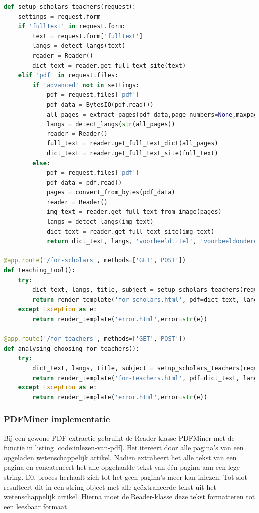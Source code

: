 \begin{lstlisting}[language=Python, caption={Koppeling tussen frontend en backend voor het inlezen van een wetenschappelijk artikel}, label={code:inlezen-wetenschappelijk-artikel-front-end-back-end}]
def setup_scholars_teachers(request):
	settings = request.form
	if 'fullText' in request.form:
		text = request.form['fullText']
		langs = detect_langs(text)
		reader = Reader()
		dict_text = reader.get_full_text_site(text)                
	elif 'pdf' in request.files:
		if 'advanced' not in settings:
			pdf = request.files['pdf']
			pdf_data = BytesIO(pdf.read())
			all_pages = extract_pages(pdf_data,page_numbers=None,maxpages=999)
			langs = detect_langs(str(all_pages))
			reader = Reader()
			full_text = reader.get_full_text_dict(all_pages)
			dict_text = reader.get_full_text_site(full_text)
		else:
			pdf = request.files['pdf']
			pdf_data = pdf.read()
			pages = convert_from_bytes(pdf_data)
			reader = Reader()
			img_text = reader.get_full_text_from_image(pages)
			langs = detect_langs(img_text)
			dict_text = reader.get_full_text_site(img_text)                            
			return dict_text, langs, 'voorbeeldtitel', 'voorbeeldonderwerp'
			
@app.route('/for-scholars', methods=['GET','POST'])
def teaching_tool():
	try:
		dict_text, langs, title, subject = setup_scholars_teachers(request)
		return render_template('for-scholars.html', pdf=dict_text, lang=langs, title=title, subject=subject)
	except Exception as e:
		return render_template('error.html',error=str(e))
	
@app.route('/for-teachers', methods=['GET','POST'])
def analysing_choosing_for_teachers():
	try:
		dict_text, langs, title, subject = setup_scholars_teachers(request)
		return render_template('for-teachers.html', pdf=dict_text, lang=langs, title=title, subject=subject)
	except Exception as e:
		return render_template('error.html',error=str(e))
\end{lstlisting}

\subsubsection{PDFMiner implementatie}

Bij een gewone PDF-extractie gebruikt de Reader-klasse PDFMiner met de functie in listing \ref{code:inlezen-van-pdf}. Het itereert door alle pagina's van een opgeladen wetenschappelijk artikel. Nadien extraheert het alle tekst van een pagina en concateneert het alle opgehaalde tekst van één pagina aan een lege string. Dit proces herhaalt zich tot het geen pagina's meer kan inlezen. Tot slot resulteert dit in een string-object met alle geëxtraheerde tekst uit het wetenschappelijk artikel. Hierna moet de Reader-klasse deze tekst formatteren tot een leesbaar formaat.

